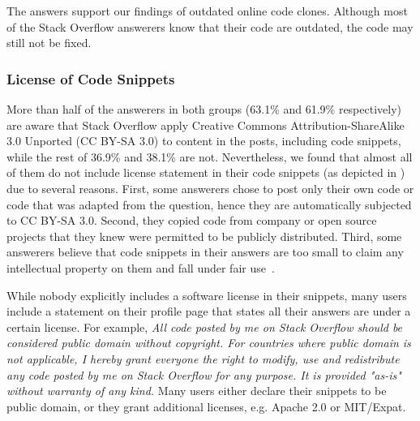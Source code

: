 \documentclass[10pt,journal,compsoc]{IEEEtran}
\begin{document}
The answers support our findings of outdated online code clones. Although most
of the Stack Overflow answerers know that their code are outdated, the code may
still not be fixed.

\subsubsection{License of Code Snippets} 
More than half of the answerers in both groups (63.1\% and 61.9\% respectively)
are aware that Stack Overflow apply Creative Commons Attribution-ShareAlike 3.0
Unported (CC BY-SA 3.0) to content in the posts, including code snippets, while
the rest of 36.9\% and 38.1\% are not. Nevertheless, we found that almost all 
of them do not include license statement in their code snippets (as depicted in
) due to several reasons. First, some answerers chose to 
post only their own code or code that was adapted from the question, hence
 they are automatically subjected to CC BY-SA 3.0. Second, they copied code from
company or open source projects that they knew were permitted to be publicly distributed.
Third, some answerers believe that code snippets in their answers are too small 
to claim any intellectual property on them and fall under fair use~\cite{fairuse}.

While nobody explicitly includes a software license in their snippets,
many users include a statement on their profile page that states all their
answers are under a certain license. For example, \textit{All code posted by me on
Stack Overflow should be considered public domain without copyright. For
countries where public domain is not applicable, I hereby grant everyone the
right to modify, use and redistribute any code posted by me on Stack Overflow
for any purpose. It is provided "as-is" without warranty of any kind.}  Many
users either declare their snippets to be public domain, or they grant
additional licenses, e.g. Apache 2.0 or MIT/Expat.
\end{document}
